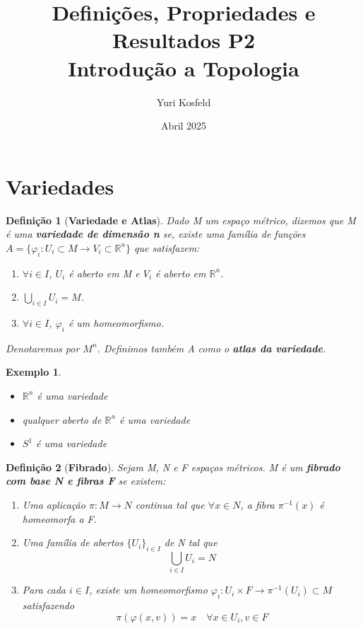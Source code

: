 \documentclass{article}
\title{Definições, Propriedades e Resultados P2 \\ \large Introdução a Topologia}
\author{Yuri Kosfeld}
\date{Abril 2025}
\newtheorem*{definition}{Definição}
\newtheorem*{exemplo}{Exemplo}
\newcommand{\R}{\mathbb{R}}
\begin{document}
\maketitle

\section{Variedades}

\begin{definition}[\textbf{Variedade e Atlas}]
    Dado M um espaço métrico, dizemos que M é uma \textbf{variedade de dimensão n}
    se, existe uma família de funções $A = \{ \varphi_i: U_i \subset M \rightarrow V_i \subset \R^n\}$
    que satisfazem:
    \begin{enumerate}
        \item $\forall i \in I$, $U_i$ é aberto em M e $V_i$ é aberto em $\R^n$.
        \item $\bigcup_{i \in I} U_i = M$.
        \item $\forall i \in I$, $\varphi_i$ é um homeomorfismo.
    \end{enumerate}
    Denotaremos por $M^n$.
    Definimos também A como o \textbf{atlas da variedade}.
\end{definition}

\begin{exemplo}
    \
    \begin{itemize}
        \item $\R^n$ é uma variedade
        \item qualquer aberto de $\R^n$ é uma variedade
        \item $S^1$ é uma variedade
    \end{itemize}
\end{exemplo}

\begin{definition}[\textbf{Fibrado}]
    Sejam M, N e F espaços métricos. M é um \textbf{fibrado com base N e fibras F} se existem:
    \begin{enumerate}
        \item Uma aplicação $\pi: M \rightarrow N$ continua tal que $\forall x \in N$, 
            a fibra $\pi^{-1}(x)$ é homeomorfa a F.
        \item Uma família de abertos $\{U_i\}_{i \in I}$ de N tal que 
            \[\bigcup_{i \in I} U_i = N\]
        \item Para cada $i \in I$, existe um homeomorfismo $\varphi_i: U_i \times F \rightarrow \pi^{-1}(U_i) \subset M$
            satisfazendo 
            \[\pi(\varphi(x, v)) = x \quad \forall x \in U_i, v \in F\]
    \end{enumerate}
\end{definition}
\end{document}
